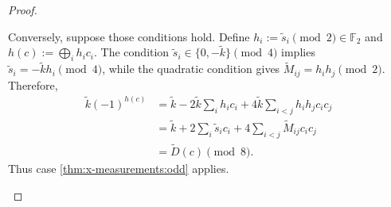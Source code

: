 \begin{proof}
\begin{enumerate}
Conversely, suppose those conditions hold.
Define $h_i:=\tilde s_i\pmod 2\in\mathbb F_2$ and $h(c):=\bigoplus_i h_ic_i$.
The condition $\tilde s_i\in\{0,-\tilde k\}\pmod 4$ implies $\tilde s_i=-\tilde k h_i\pmod 4$, while the quadratic condition gives $\tilde M_{ij}=h_ih_j\pmod 2$.
Therefore,
\begin{align}
    \tilde k(-1)^{h(c)}
    &=\tilde k-2\tilde k\sum_i h_i c_i
    +4\tilde k\sum_{i<j}h_ih_jc_ic_j\\
    &=\tilde k+2\sum_i\tilde s_i c_i
    +4\sum_{i<j}\tilde M_{ij}c_ic_j\\
    &=\widetilde D(c)\pmod 8.
\end{align}
Thus case \ref{thm:x-measurements:odd} applies.
\qedhere
\end{enumerate}
\end{proof}


